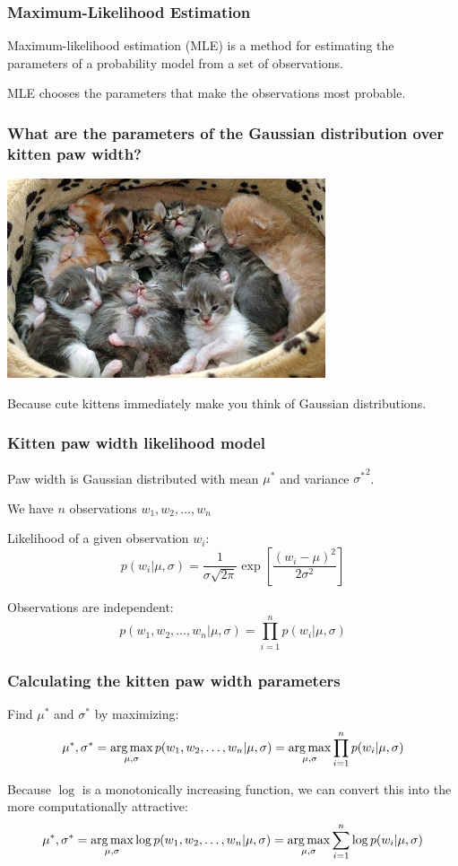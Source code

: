 \begin{frame}
  \frametitle{Maximum-Likelihood Estimation}
  \begin{center}
    Maximum-likelihood estimation (MLE) is a method for estimating the parameters
    of a probability model from a set of observations.
    \vspace{3em}
    
    MLE chooses the parameters that make the observations most probable.
  \end{center}
\end{frame}

\begin{frame}
  \frametitle{What are the parameters of the Gaussian distribution over kitten
    paw width?}
  \begin{center}
    \includegraphics[width=3.7in]{img/Kittens.jpg}

    Because cute kittens immediately make you think of Gaussian distributions.
  \end{center}
\end{frame}

\begin{frame}
  \frametitle{Kitten paw width likelihood model}
  Paw width is Gaussian distributed with mean $\mu^*$ and variance ${\sigma^*}^2$.
  \vspace{1em}

  We have $n$ observations $w_1, w_2, ..., w_n$
  \vspace{1em}

  Likelihood of a given observation $w_i$:
  \[p(w_i|\mu, \sigma) = \frac1{ \sigma \sqrt{2 \pi}} \exp{\left[ \frac{(w_i -
      \mu)^2}{2 \sigma^2} \right]}\]

  Observations are independent:
  \[p(w_1, w_2, \ldots, w_n|\mu, \sigma) = \displaystyle \prod_{i=1}^n p(w_i|\mu, \sigma)\]

\end{frame}

\begin{frame}
\frametitle{Calculating the kitten paw width parameters}
  Find $\mu^*$ and $\sigma^*$ by maximizing:
  \[\mu^*, \sigma^* = \operatorname*{arg\,max}_{\mu, \sigma}{p(w_1, w_2, \ldots, w_n|\mu,
    \sigma)} = \operatorname*{arg\,max}_{\mu, \sigma}{\displaystyle \prod_{i=1}^n p(w_i|\mu,
    \sigma)}\]

  Because $\log$ is a monotonically increasing function, we can convert this
  into the more computationally attractive:
  \[\mu^*, \sigma^* = \operatorname*{arg\,max}_{\mu, \sigma}{\log{p(w_1, w_2, \ldots, w_n|\mu,
    \sigma)}} = \operatorname*{arg\,max}_{\mu, \sigma}{\displaystyle \sum_{i=1}^n \log{p(w_i|\mu,
    \sigma)}}\]
\end{frame}